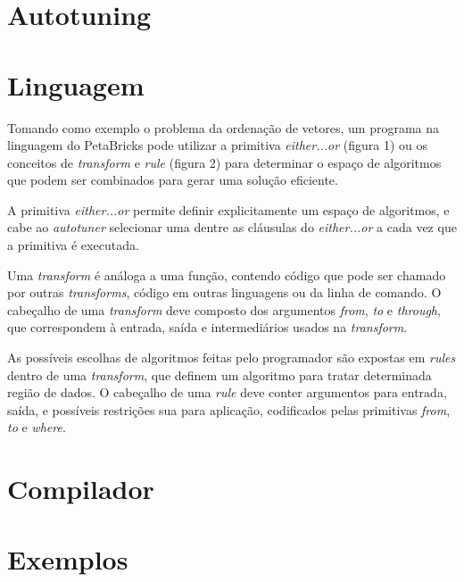 \documentclass[a4paper, 11pt, twoside]{article}
\begin{document}
\section*{Autotuning}

\section*{Linguagem}

Tomando como exemplo o problema da ordenação de vetores, um programa na
linguagem do PetaBricks pode utilizar a primitiva \emph{either...or} (figura 1)
ou os conceitos de \emph{transform} e \emph{rule} (figura 2) para determinar
o espaço de algoritmos que podem ser combinados para gerar uma solução 
eficiente.

A primitiva \emph{either...or} permite definir explicitamente um espaço
de algoritmos, e cabe ao \emph{autotuner} selecionar uma dentre as cláusulas
do \emph{either...or} a cada vez que a primitiva é executada.

Uma \emph{transform} é análoga a uma função, contendo código que pode
ser chamado por outras \emph{transforms}, código em outras linguagens
ou da linha de comando. O cabeçalho de uma \emph{transform} deve composto
dos argumentos \emph{from}, \emph{to} e \emph{through}, que correspondem
à entrada, saída e intermediários usados na \emph{transform}.

As possíveis escolhas de algoritmos feitas pelo programador são expostas 
em \emph{rules} dentro de uma \emph{transform}, que definem um algoritmo
para tratar determinada região de dados. O cabeçalho de uma \emph{rule} deve
conter argumentos para entrada, saída, e possíveis restrições sua para 
aplicação, codificados pelas primitivas \emph{from}, \emph{to} e \emph{where}.

\section*{Compilador}

\section*{Exemplos}

\newpage


\end{document}
